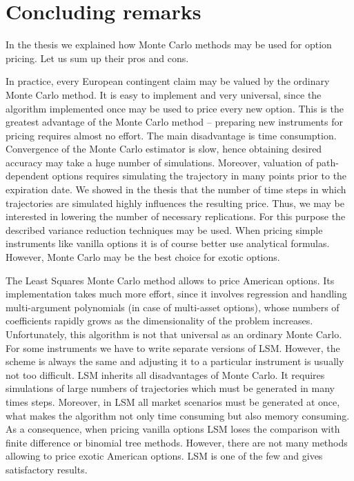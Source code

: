 \documentclass[a4paper,11pt, twoside]{book}
\theoremstyle{definition}
\theoremstyle{remark}
\begin{document}
\chapter*{Concluding remarks}
In the thesis we explained how Monte Carlo methods may be used for option pricing. Let us sum up their pros and cons.

In practice, every European contingent claim may be valued by the ordinary Monte Carlo method. It is easy to implement and very universal, since the algorithm implemented once may be used to price every new option. This is the greatest advantage of the Monte Carlo method -- preparing new instruments for pricing requires almost no effort. The main disadvantage is time consumption. Convergence of the Monte Carlo estimator is slow, hence obtaining desired accuracy may take a huge number of simulations. Moreover, valuation of path-dependent options requires simulating the trajectory in many points prior to the expiration date. We showed in the thesis that the number of time steps in which trajectories are simulated highly influences  the resulting price. Thus, we may be interested in lowering the number of necessary replications. For this purpose the described variance reduction techniques may be used. When pricing simple instruments like vanilla options it is of course better use analytical formulas. However, Monte Carlo may be the best choice for exotic options.


The Least Squares Monte Carlo method allows to price American options. Its implementation takes much more effort, since it involves regression and handling multi-argument polynomials (in case of multi-asset options), whose numbers of coefficients rapidly grows as the dimensionality of the problem increases. Unfortunately, this algorithm is not that universal as an ordinary Monte Carlo. For some instruments we have to write separate versions of LSM. However, the scheme is always the same and adjusting it to a particular instrument is usually not too difficult. LSM inherits all disadvantages of Monte Carlo. It requires simulations of large numbers of trajectories which must be generated in many times steps. Moreover, in LSM all market scenarios must be generated at once, what makes the algorithm not only time consuming but also memory consuming. As a consequence, when pricing vanilla options LSM loses the comparison with finite difference or binomial tree methods. However, there are not many methods allowing to price exotic American options. LSM is one of the few and gives satisfactory results.
\end{document}
